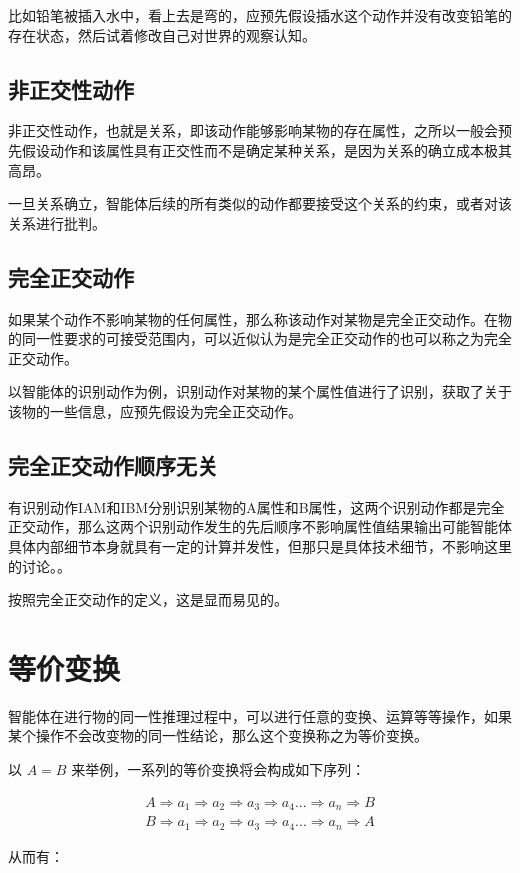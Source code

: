 \documentclass[12pt,oneside]{book}
\begin{document}
比如铅笔被插入水中，看上去是弯的，应预先假设插水这个动作并没有改变铅笔的存在状态，然后试着修改自己对世界的观察认知。

\subsection{非正交性动作}
非正交性动作，也就是关系，即该动作能够影响某物的存在属性，之所以一般会预先假设动作和该属性具有正交性而不是确定某种关系，是因为关系的确立成本极其高昂。

一旦关系确立，智能体后续的所有类似的动作都要接受这个关系的约束，或者对该关系进行批判。

\subsection{完全正交动作}
如果某个动作不影响某物的任何属性，那么称该动作对某物是完全正交动作。在物的同一性要求的可接受范围内，可以近似认为是完全正交动作的也可以称之为完全正交动作。

以智能体的识别动作为例，识别动作对某物的某个属性值进行了识别，获取了关于该物的一些信息，应预先假设为完全正交动作。

\subsection{完全正交动作顺序无关}
有识别动作IAM和IBM分别识别某物的A属性和B属性，这两个识别动作都是完全正交动作，那么这两个识别动作发生的先后顺序不影响属性值结果输出{可能智能体具体内部细节本身就具有一定的计算并发性，但那只是具体技术细节，不影响这里的讨论。}。

按照完全正交动作的定义，这是显而易见的。


\section{等价变换}
智能体在进行物的同一性推理过程中，可以进行任意的变换、运算等等操作，如果某个操作不会改变物的同一性结论，那么这个变换称之为等价变换。

以 $A=B$ 来举例，一系列的等价变换将会构成如下序列：

\begin{align*}
A \Rightarrow a_1 \Rightarrow a_2 \Rightarrow a_3 \Rightarrow a_4 ... \Rightarrow a_n \Rightarrow B \\
B \Rightarrow a_1 \Rightarrow a_2 \Rightarrow a_3 \Rightarrow a_4 ... \Rightarrow a_n \Rightarrow A
\end{align*}

从而有：
\end{document}
